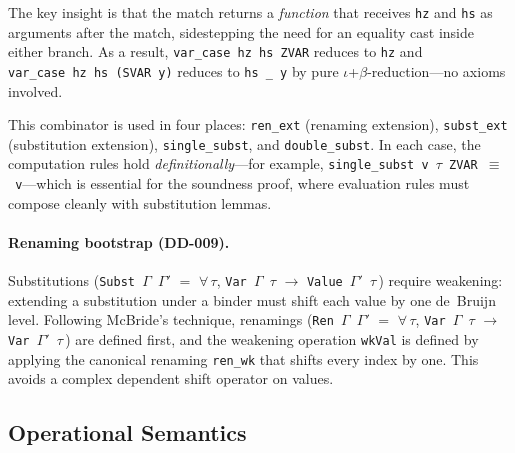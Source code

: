 The key insight is that the match returns a \emph{function} that
receives \texttt{hz} and \texttt{hs} as arguments after the match,
sidestepping the need for an equality cast inside either branch.
As a result, \texttt{var\_case~hz~hs~ZVAR} reduces to \texttt{hz}
and \texttt{var\_case~hz~hs~(SVAR~y)} reduces to \texttt{hs~\_~y}
by pure $\iota$+$\beta$-reduction---no axioms involved.

This combinator is used in four places: \texttt{ren\_ext} (renaming
extension), \texttt{subst\_ext} (substitution extension),
\texttt{single\_subst}, and \texttt{double\_subst}.  In each case,
the computation rules hold \emph{definitionally}---for example,
\texttt{single\_subst~v~$\tau$~ZVAR~$\equiv$~v}---which is
essential for the soundness proof, where evaluation rules must
compose cleanly with substitution lemmas.

\paragraph{Renaming bootstrap (DD-009).}
Substitutions (\texttt{Subst~$\Gamma$~$\Gamma'$} $=$
$\forall\,\tau$, \texttt{Var~$\Gamma$~$\tau$} $\to$
\texttt{Value~$\Gamma'$~$\tau$}$\,$) require weakening: extending
a substitution under a binder must shift each value by one de~Bruijn
level.  Following McBride's technique, renamings
(\texttt{Ren~$\Gamma$~$\Gamma'$} $=$
$\forall\,\tau$, \texttt{Var~$\Gamma$~$\tau$} $\to$
\texttt{Var~$\Gamma'$~$\tau$}$\,$) are defined first, and the
weakening operation \texttt{wkVal} is defined by applying the
canonical renaming \texttt{ren\_wk} that shifts every index by one.
This avoids a complex dependent shift operator on values.

\subsection{Operational Semantics}
\label{sec:meth-pcf-operational}



